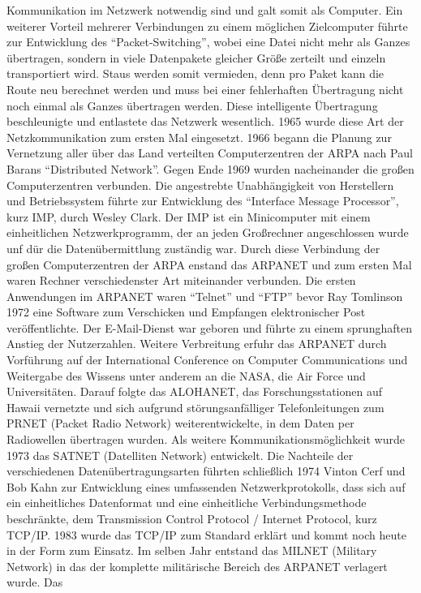 Kommunikation im Netzwerk notwendig sind und galt somit als Computer. Ein
weiterer Vorteil mehrerer Verbindungen zu einem möglichen Zielcomputer
führte zur Entwicklung des ``Packet-Switching'', wobei eine Datei nicht mehr
als Ganzes übertragen, sondern in viele Datenpakete gleicher Größe zerteilt
und einzeln transportiert wird. Staus werden somit vermieden, denn pro Paket
kann die Route neu berechnet werden und muss bei einer fehlerhaften
Übertragung nicht noch einmal als Ganzes übertragen werden. Diese intelligente
Übertragung beschleunigte und entlastete das Netzwerk wesentlich. 1965 wurde
diese Art der Netzkommunikation zum ersten Mal eingesetzt. 1966 begann
die Planung zur Vernetzung aller über das Land verteilten Computerzentren
der ARPA nach Paul Barans ``Distributed Network''. Gegen Ende 1969 wurden
nacheinander die großen Computerzentren verbunden.
Die angestrebte Unabhängigkeit von Herstellern und Betriebssystem führte zur
Entwicklung des ``Interface Message Processor'', kurz IMP, durch Wesley Clark.
Der IMP ist ein Minicomputer mit einem einheitlichen Netzwerkprogramm, der an
jeden Großrechner angeschlossen wurde unf dür die Datenübermittlung zuständig
war. Durch diese Verbindung der großen Computerzentren der ARPA enstand das
ARPANET und zum ersten Mal waren Rechner verschiedenster Art miteinander
verbunden. Die ersten Anwendungen im ARPANET waren ``Telnet'' und ``FTP''
bevor Ray Tomlinson 1972 eine Software zum Verschicken und Empfangen
elektronischer Post veröffentlichte. Der E-Mail-Dienst war geboren und
führte zu einem sprunghaften Anstieg der Nutzerzahlen. Weitere Verbreitung
erfuhr das ARPANET durch Vorführung auf der International Conference on
Computer Communications und Weitergabe des Wissens unter anderem an die NASA,
die Air Force und Universitäten. Darauf folgte das ALOHANET, das
Forschungsstationen auf Hawaii vernetzte und sich aufgrund störungsanfälliger
Telefonleitungen zum PRNET (Packet Radio Network) weiterentwickelte, in dem
Daten per Radiowellen übertragen wurden. Als weitere Kommunikationsmöglichkeit
wurde 1973 das SATNET (Datelliten Network) entwickelt. Die Nachteile der
verschiedenen Datenübertragungsarten führten schließlich 1974 Vinton Cerf und
Bob Kahn zur Entwicklung eines umfassenden Netzwerkprotokolls, dass sich auf
ein einheitliches Datenformat und eine einheitliche Verbindungsmethode
beschränkte, dem Transmission Control Protocol / Internet Protocol, kurz
TCP/IP. 1983 wurde das TCP/IP zum Standard erklärt und kommt noch heute in der
Form zum Einsatz. Im selben Jahr entstand das MILNET (Military Network) in
das der komplette militärische Bereich des ARPANET verlagert wurde. Das
